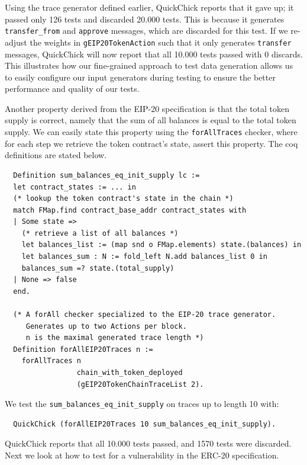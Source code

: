 \documentclass[twoside,11pt,openright]{report}
\newenvironment{code}{\captionsetup{type=figure, singlelinecheck=off, justification=raggedleft}}{}
\newcommand{\coq}[1]{\texttt{#1}}
\begin{document}
Using the trace generator defined earlier, QuickChick reports that it gave up; it passed only 126 tests and discarded 20.000 tests. This is because it generates \coq{transfer\_from} and \coq{approve} messages, which are discarded for this test. If we re-adjust the weights in \coq{gEIP20TokenAction} such that it only generates \coq{transfer} messages, QuickChick will now report that all 10.000 tests passed with 0 discards. This illustrates how our fine-grained approach to test data generation allows us to easily configure our input generators during testing to ensure the better performance and quality of our tests. 

Another property derived from the EIP-20 specification is that the total token supply is correct, namely that the sum of all balances is equal to the total token supply. We can easily state this property using the \coq{forAllTraces} checker, where for each step we retrieve the token contract's state, assert this property. The coq definitions are stated below.
\begin{code}
\label{def:forAllEIP20Traces}
\begin{verbatim}
  Definition sum_balances_eq_init_supply lc :=
  let contract_states := ... in
  (* lookup the token contract's state in the chain *)
  match FMap.find contract_base_addr contract_states with
  | Some state => 
    (* retrieve a list of all balances *)
    let balances_list := (map snd o FMap.elements) state.(balances) in
    let balances_sum : N := fold_left N.add balances_list 0 in
    balances_sum =? state.(total_supply)
  | None => false
  end.

  (* A forAll checker specialized to the EIP-20 trace generator. 
     Generates up to two Actions per block.
     n is the maximal generated trace length *)
  Definition forAllEIP20Traces n := 
    forAllTraces n 
                 chain_with_token_deployed 
                 (gEIP20TokenChainTraceList 2).
\end{verbatim}
\end{code}
We test the \coq{sum\_balances\_eq\_init\_supply} on traces up to length 10 with:
\begin{code}
\begin{verbatim}
  QuickChick (forAllEIP20Traces 10 sum_balances_eq_init_supply).
\end{verbatim}
\end{code}
QuickChick reports that all 10.000 tests passed, and 1570 tests were discarded. Next we look at how to test for a vulnerability in the ERC-20 specification.
\end{document}

